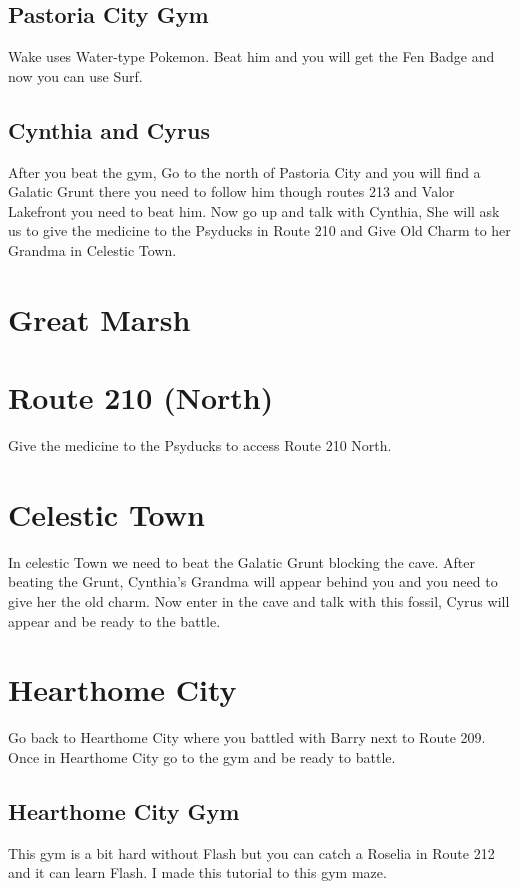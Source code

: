 \documentclass[11pt]{article}
\begin{document}
\subsection{Pastoria City Gym}\label{subsec:pastoria-city-gym}
Wake uses Water-type Pokemon.
Beat him and you will get the Fen Badge and now you can use Surf.

\subsection{Cynthia and Cyrus}\label{subsec:cynthia-and-cyrus}
After you beat the gym, Go to the north of Pastoria City
and you will find a Galatic Grunt there you need to follow him though routes 213
and Valor Lakefront you need to beat him.
Now go up and talk with Cynthia, She will ask us to give the medicine to the
Psyducks in Route 210 and Give Old Charm to her Grandma in Celestic Town.

\section{Great Marsh}
\label{sec:Great_Marsh}


\section{Route 210 (North)}\label{sec:route-210-(north)}
Give the medicine to the Psyducks to access Route 210 North.

\section{Celestic Town}\label{sec:celestic-town}
In celestic Town we need to beat the Galatic Grunt blocking the cave.
After beating the Grunt, Cynthia's Grandma will appear behind you
and you need to give her the old charm.
Now enter in the cave and talk with this fossil, Cyrus will appear and be ready to the battle.

\section{Hearthome City}\label{sec:hearthome-city}
Go back to Hearthome City where you battled with Barry next to Route 209.
Once in Hearthome City go to the gym and be ready to battle.

\subsection{Hearthome City Gym}\label{subsec:hearthome-city-gym}
This gym is a bit hard without Flash but you can catch a Roselia in Route 212
and it can learn Flash.
I made this tutorial to this gym maze.
\end{document}
